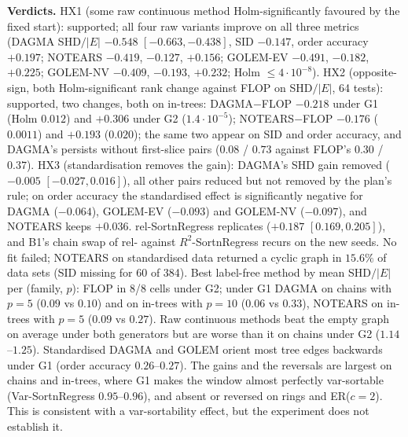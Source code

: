 \textbf{Verdicts.} HX1 (some raw continuous method Holm-significantly favoured
by the fixed start): supported; all four raw variants improve on all three
metrics (DAGMA SHD$/|E|$ $-0.548$ $[-0.663,-0.438]$, SID $-0.147$, order
accuracy $+0.197$; NOTEARS $-0.419$, $-0.127$, $+0.156$; GOLEM-EV $-0.491$,
$-0.182$, $+0.225$; GOLEM-NV $-0.409$, $-0.193$, $+0.232$; Holm $\le4\cdot10^{-8}$).
HX2 (opposite-sign, both Holm-significant rank change against FLOP on
SHD$/|E|$, 64 tests): supported, two changes, both on in-trees: DAGMA$-$FLOP
$-0.218$ under G1 (Holm $0.012$) and $+0.306$ under G2 ($1.4\cdot10^{-5}$);
NOTEARS$-$FLOP $-0.176$ ($0.0011$) and $+0.193$ ($0.020$); the same two appear on
SID and order accuracy, and DAGMA's persists without first-slice pairs ($0.08$ /
$0.73$ against FLOP's $0.30$ / $0.37$). HX3 (standardisation removes the gain):
DAGMA's SHD gain removed ($-0.005$ $[-0.027,0.016]$), all other pairs reduced
but not removed by the plan's rule; on order accuracy the standardised effect is
significantly negative for DAGMA ($-0.064$), GOLEM-EV ($-0.093$) and GOLEM-NV
($-0.097$), and NOTEARS keeps $+0.036$. rel-SortnRegress replicates ($+0.187$
$[0.169,0.205]$), and B1's chain swap of rel- against $R^2$-SortnRegress recurs
on the new seeds. No fit failed; NOTEARS on standardised data returned a cyclic
graph in $15.6\%$ of data sets (SID missing for 60 of 384). Best label-free
method by mean SHD$/|E|$ per (family, $p$): FLOP in 8/8 cells under G2; under G1
DAGMA on chains with $p=5$ ($0.09$ vs $0.10$) and on in-trees with $p=10$ ($0.06$ vs
$0.33$), NOTEARS on in-trees with $p=5$ ($0.09$ vs $0.27$). Raw continuous methods
beat the empty graph on average under both generators but are worse than it
on chains under G2 ($1.14$--$1.25$). Standardised DAGMA and GOLEM orient most
tree edges backwards under G1 (order accuracy $0.26$--$0.27$). The gains and
the reversals are largest on chains and in-trees, where G1 makes the window
almost perfectly var-sortable (Var-SortnRegress $0.95$--$0.96$), and absent or
reversed on rings and ER($c{=}2$). This is consistent with a var-sortability
effect, but the experiment does not establish it.

